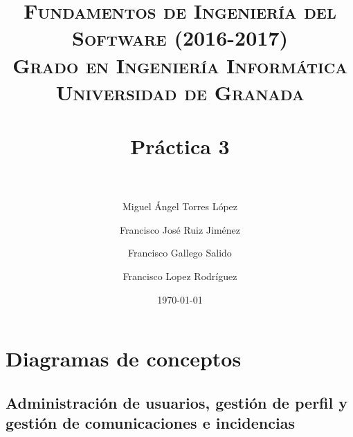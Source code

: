 



\title{	
\normalfont \normalsize 
\textsc{\textbf{Fundamentos de Ingeniería del Software (2016-2017)} \\ Grado en Ingeniería Informática \\ Universidad de Granada} \\ [25pt] %
\horrule{2pt} \\[0.4cm] %
\huge Práctica 3 \\ %
\horrule{2pt} \\[0.5cm] %
}

\author{Miguel Ángel Torres López \and Francisco José Ruiz Jiménez \and Francisco Gallego Salido \and Francisco Lopez Rodríguez} %


\date{\normalsize\today} %




	\maketitle %
	
	\newpage %
	
	\tableofcontents %
	
	\listoffigures
	
	\newpage
	
	\section{Diagramas de conceptos}
	
	\subsection{Administración de usuarios, gestión de perfil y gestión de comunicaciones e incidencias}
	
